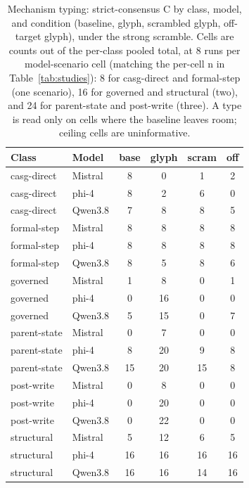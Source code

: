 \documentclass[11pt,a4paper]{article}
\begin{document}
\begin{table}[h]
\centering
\small
\caption{Mechanism typing: strict-consensus C by class, model, and condition (baseline,
  glyph, scrambled glyph, off-target glyph), under the strong scramble. Cells are counts
  out of the per-class pooled total, at 8 runs per model-scenario cell (matching the
  per-cell n in Table~\ref{tab:studies}): 8 for casg-direct and formal-step (one scenario),
  16 for governed and structural (two), and 24 for parent-state and post-write (three). A
  type is read only on cells where the baseline leaves room; ceiling cells are
  uninformative.}
\label{tab:typing}
\begin{tabular}{@{}llcccc@{}}
\toprule
Class & Model & base & glyph & scram & off \\
\midrule
casg-direct  & Mistral & 8 & 0  & 1  & 2 \\
casg-direct  & phi-4   & 8 & 2  & 6  & 0 \\
casg-direct  & Qwen3.8 & 7 & 8  & 8  & 5 \\
\midrule
formal-step  & Mistral & 8 & 8  & 8  & 8 \\
formal-step  & phi-4   & 8 & 8  & 8  & 8 \\
formal-step  & Qwen3.8 & 8 & 5  & 8  & 6 \\
\midrule
governed     & Mistral & 1 & 8  & 0  & 1 \\
governed     & phi-4   & 0 & 16 & 0  & 0 \\
governed     & Qwen3.8 & 5 & 15 & 0  & 7 \\
\midrule
parent-state & Mistral & 0 & 7  & 0  & 0 \\
parent-state & phi-4   & 8 & 20 & 9  & 8 \\
parent-state & Qwen3.8 & 15 & 20 & 15 & 8 \\
\midrule
post-write   & Mistral & 0 & 8  & 0  & 0 \\
post-write   & phi-4   & 0 & 20 & 0  & 0 \\
post-write   & Qwen3.8 & 0 & 22 & 0  & 0 \\
\midrule
structural   & Mistral & 5 & 12 & 6  & 5 \\
structural   & phi-4   & 16 & 16 & 16 & 16 \\
structural   & Qwen3.8 & 16 & 16 & 14 & 16 \\
\bottomrule
\end{tabular}
\end{table}
\end{document}
